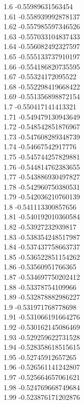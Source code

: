 {1.6	-0.55989631563454\\
1.61	-0.558939992878137\\
1.62	-0.557985597346526\\
1.63	-0.557033104837433\\
1.64	-0.556082492327597\\
1.65	-0.555133737910197\\
1.66	-0.554186820735595\\
1.67	-0.55324172095522\\
1.68	-0.552298419668422\\
1.69	-0.551356898872154\\
1.7	-0.550417141413321\\
1.71	-0.549479130943649\\
1.72	-0.548542851876967\\
1.73	-0.547608289348739\\
1.74	-0.54667542917776\\
1.75	-0.545744257829881\\
1.76	-0.544814762383655\\
1.77	-0.543886930497827\\
1.78	-0.542960750380531\\
1.79	-0.542036210760139\\
1.8	-0.541113300857656\\
1.81	-0.540192010360584\\
1.82	-0.53927232939817\\
1.83	-0.538354248517987\\
1.84	-0.537437758663737\\
1.85	-0.536522851154262\\
1.86	-0.53560951766365\\
1.87	-0.534697750202412\\
1.88	-0.53378754109966\\
1.89	-0.532878882986227\\
1.9	-0.531971768778698\\
1.91	-0.531066191664276\\
1.92	-0.530162145086469\\
1.93	-0.529259622731528\\
1.94	-0.528358618515615\\
1.95	-0.52745912657265\\
1.96	-0.526561141242807\\
1.97	-0.525664657061621\\
1.98	-0.524769668749684\\
1.99	-0.523876171202876\\
}
